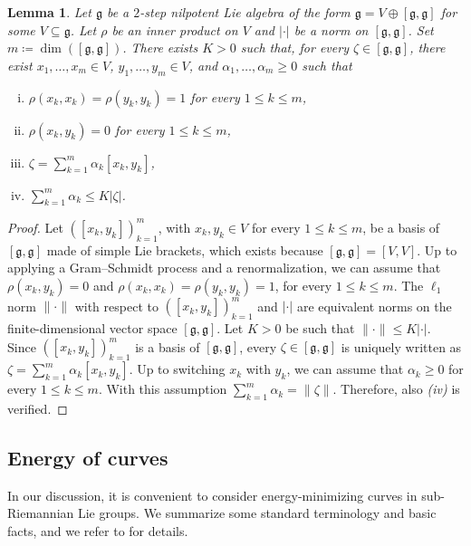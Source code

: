 \documentclass[a4paper,11pt,reqno]{amsart}
\theoremstyle{plain}
\newtheorem{lemma}[theorem]{Lemma}
\theoremstyle{definition}
\newcommand{\g}{\mathfrak{g}}
\newcommand{\coloneq}{\coloneqq}
\begin{document}
\begin{lemma} \label{equivalence_norms}
 Let $\g$ be a $2$-step nilpotent Lie algebra of the form $\g=V \oplus [\g,\g]$ for some $V \subseteq \g$. Let $\rho$ be an inner product on $V$ and $\lvert \cdot \rvert$ be a norm on $[\g,\g]$. Set $m \coloneq \dim([\g,\g])$. There exists $K > 0$ such that, for every $\zeta \in [\g,\g]$, there exist $x_1,\dots,x_{m} \in V$, $y_1,\dots,y_{m} \in V$, and $\alpha_1,\dots,\alpha_{m} \ge 0$ such that
 \begin{enumerate}[(i)]
 \item $\rho(x_k,x_k)=\rho(y_k,y_k)=1$ for every $1 \le k \le m$,
 \item $\rho(x_k,y_k)=0$ for every $1 \le k \le m$,
 \item $\zeta = \sum_{k=1}^{m} \alpha_k[x_k,y_k]$,
 \item $\sum_{k=1}^{m} \alpha_k \le K \lvert \zeta \rvert$.
 \end{enumerate}
\end{lemma}
\begin{proof}
 Let $\left([x_k,y_k]\right)_{k=1}^{m}$, with $x_k,y_k \in V$ for every $1 \le k \le m$, be a basis of $[\g,\g]$ made of simple Lie brackets, which exists because $[\g,\g]=[V,V]$. Up to applying a Gram–Schmidt process and a renormalization, we can assume that $\rho(x_k,y_k)=0$ and $\rho(x_k,x_k)=\rho(y_k,y_k)=1$, for every $1 \le k \le m$. The $\ell_1$ norm $\lVert \cdot \rVert$ with respect to $\left([x_k,y_k]\right)_{k=1}^{m}$ and $\lvert \cdot \rvert$ are equivalent norms on the finite-dimensional vector space $[\g,\g]$. Let $K > 0$ be such that $\lVert \cdot \rVert \le K \lvert \cdot \rvert$. Since $\left([x_k,y_k]\right)_{k=1}^{m}$ is a basis of $[\g,\g]$, every $\zeta \in [\g,\g]$ is uniquely written as $\zeta = \sum_{k=1}^{m} \alpha_k[x_k,y_k]$. Up to switching $x_k$ with $y_k$, we can assume that $\alpha_k \ge 0$ for every $1 \le k \le m$. With this assumption $\sum_{k=1}^{m} \alpha_k = \lVert \zeta \rVert$. Therefore, also \emph{(iv)} is verified.
\end{proof}




\subsection{Energy of curves} In our discussion, it is convenient to consider energy-minimizing curves in sub-Riemannian Lie groups. We summarize some standard terminology and basic facts, and we refer to \cite[Section 7.3]{donne2024metricliegroupscarnotcaratheodory} for details.
\end{document}
